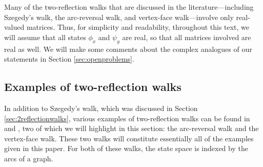 \documentclass{article}
\numberwithin{equation}{section}
\begin{document}
Many of the two-reflection walks that are discussed in the literature---including Szegedy's walk, the arc-reversal walk, and vertex-face walk---involve only real-valued matrices. Thus, for simplicity and readability, throughout this text, we will assume that all states $\phi_x$ and $\psi_y$ are real, so that all matrices involved are real as well. We will make some comments about the complex analogues of our statements in Section \ref{sec:openproblems}.

\subsection{Examples of two-reflection walks }\label{sec:2-reflection-examples}

In addition to Szegedy's walk, which was discussed in Section \ref{sec:2reflectionwalks}, various examples of two-reflection walks can be found in \cite{GodZha2019} and \cite{GodZha2023}, two of which we will highlight in this section: the arc-reversal walk and the vertex-face walk. These two walks will constitute essentially all of the examples given in this paper. For both of these walks, the state space is indexed by the arcs of a graph.
\end{document}
